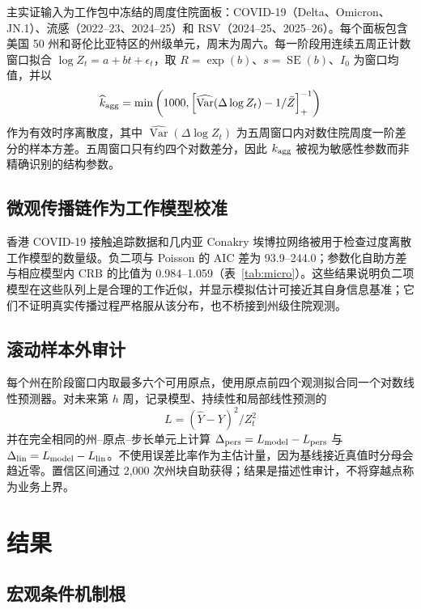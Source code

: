 \documentclass[11pt,a4paper]{article}
\begin{document}
主实证输入为工作包中冻结的周度住院面板：COVID-19（Delta、Omicron、JN.1）、流感（2022--23、2024--25）和 RSV（2024--25、2025--26）。每个面板包含美国 50 州和哥伦比亚特区的州级单元，周末为周六。每一阶段用连续五周正计数窗口拟合 $\log Z_t=a+bt+\epsilon_t$，取 $R=\exp(b)$、$s=\operatorname{SE}(b)$、$I_0$ 为窗口均值，并以
\begin{equation}
\widehat k_{\rm agg}=\min\left(1000,\left[\widehat{\operatorname{Var}}(\Delta\log Z_t)-1/\bar Z\right]^{-1}_+\right)
\end{equation}
作为有效时序离散度，其中 $\widehat{\operatorname{Var}}(\Delta\log Z_t)$ 为五周窗口内对数住院周度一阶差分的样本方差。五周窗口只有约四个对数差分，因此 $k_{\rm agg}$ 被视为敏感性参数而非精确识别的结构参数。

\subsection{微观传播链作为工作模型校准}

香港 COVID-19 接触追踪数据\citep{adam2020clustering}和几内亚 Conakry 埃博拉网络\citep{faye2015chains}被用于检查过度离散工作模型的数量级。负二项与 Poisson 的 AIC 差为 93.9--244.0；参数化自助方差与相应模型内 CRB 的比值为 0.984--1.059（表~\ref{tab:micro}）。这些结果说明负二项模型在这些队列上是合理的工作近似，并显示模拟估计可接近其自身信息基准；它们不证明真实传播过程严格服从该分布，也不桥接到州级住院观测。

\subsection{滚动样本外审计}

每个州在阶段窗口内取最多六个可用原点，使用原点前四个观测拟合同一个对数线性预测器。对未来第 $h$ 周，记录模型、持续性和局部线性预测的
\begin{equation}
L=(\widehat Y-Y)^2/Z_t^2
\end{equation}
并在完全相同的州--原点--步长单元上计算 $\Delta_{\rm pers}=L_{\rm model}-L_{\rm pers}$ 与 $\Delta_{\rm lin}=L_{\rm model}-L_{\rm lin}$。不使用误差比率作为主估计量，因为基线接近真值时分母会趋近零。置信区间通过 2,000 次州块自助获得；结果是描述性审计，不将穿越点称为业务上界。

\section{结果}

\subsection{宏观条件机制根}
\end{document}
